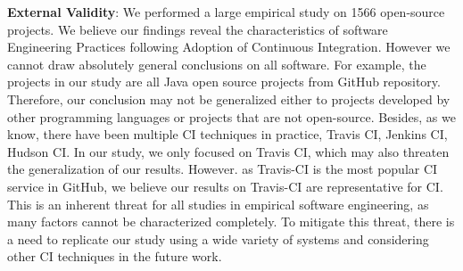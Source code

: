 \textbf{External Validity}: We performed a large empirical study on 1566 open-source projects. We believe our findings reveal the characteristics of software Engineering Practices following Adoption of Continuous Integration. However we cannot draw absolutely general conclusions on all software.
For example, the projects in our study are all Java open source projects from GitHub repository. Therefore, our conclusion may not be generalized either to projects developed by other programming languages or projects that are not open-source. Besides, as we know, there have been multiple CI techniques in practice, \eg Travis CI, Jenkins CI, Hudson CI. In our study, we only focused on Travis CI, which may also threaten the generalization of our results. However. as Travis-CI is the most popular CI service in GitHub, we believe our results on Travis-CI are representative for CI.  This is an inherent threat for all studies in empirical software engineering, as many factors cannot be characterized completely. To mitigate this threat, there is a need to replicate our study using a wide variety of systems and considering other CI techniques in the future work.
